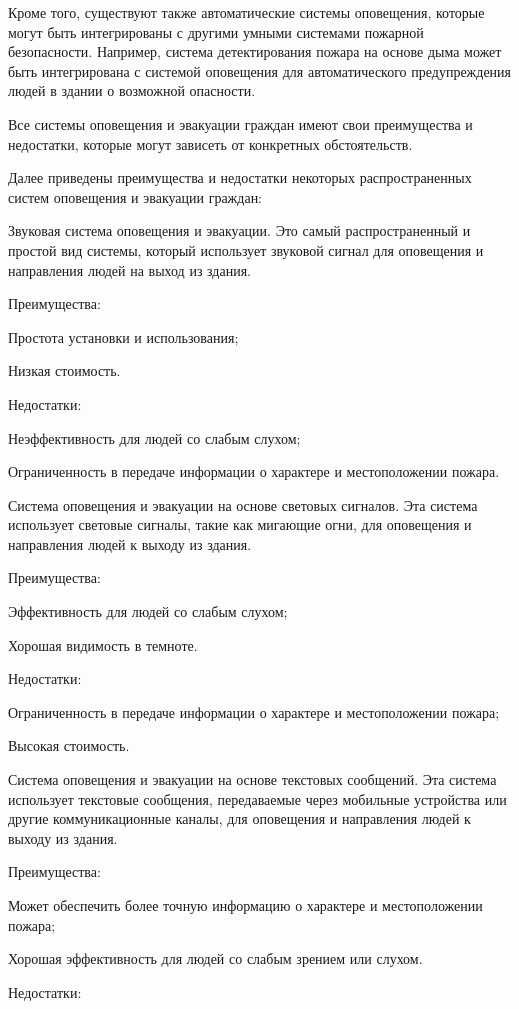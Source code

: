 \begin{multicols}{2}
Кроме того, существуют также автоматические системы оповещения, которые
могут быть интегрированы с другими умными системами пожарной
безопасности. Например, система детектирования пожара на основе дыма
может быть интегрирована с системой оповещения для автоматического
предупреждения людей в здании о возможной опасности.

Все системы оповещения и эвакуации граждан имеют свои преимущества и
недостатки, которые могут зависеть от конкретных обстоятельств.

Далее приведены преимущества и недостатки некоторых распространенных
систем оповещения и эвакуации граждан:

Звуковая система оповещения и эвакуации. Это самый распространенный и
простой вид системы, который использует звуковой сигнал для оповещения и
направления людей на выход из здания.

Преимущества:

Простота установки и использования;

Низкая стоимость.

Недостатки:

Неэффективность для людей со слабым слухом;

Ограниченность в передаче информации о характере и местоположении
пожара.

Система оповещения и эвакуации на основе световых сигналов. Эта система
использует световые сигналы, такие как мигающие огни, для оповещения и
направления людей к выходу из здания.

Преимущества:

Эффективность для людей со слабым слухом;

Хорошая видимость в темноте.

Недостатки:

Ограниченность в передаче информации о характере и местоположении
пожара;

Высокая стоимость.

Система оповещения и эвакуации на основе текстовых сообщений. Эта
система использует текстовые сообщения, передаваемые через мобильные
устройства или другие коммуникационные каналы, для оповещения и
направления людей к выходу из здания.

Преимущества:

Может обеспечить более точную информацию о характере и местоположении
пожара;

Хорошая эффективность для людей со слабым зрением или слухом.

Недостатки:


\end{multicols}
